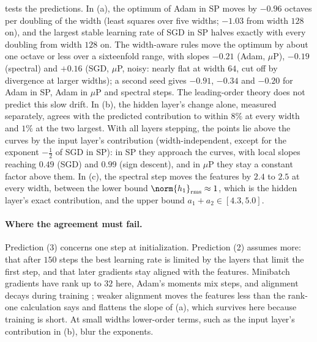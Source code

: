 \begin{refsection}
 tests the predictions. In (a), the optimum of Adam in SP moves by $-0.96$ octaves per doubling of the width (least squares over five widths; $-1.03$ from width $128$ on), and the largest stable learning rate of SGD in SP halves exactly with every doubling from width $128$ on. The width-aware rules move the optimum by about one octave or less over a sixteenfold range, with slopes $-0.21$ (Adam, $\mu$P), $-0.19$ (spectral) and $+0.16$ (SGD, $\mu$P, noisy: nearly flat at width $64$, cut off by divergence at larger widths); a second seed gives $-0.91$, $-0.34$ and $-0.20$ for Adam in SP, Adam in $\mu$P and spectral steps. The leading-order theory does not predict this slow drift. In (b), the hidden layer's change alone, measured separately, agrees with the predicted contribution to within $8\%$ at every width and $1\%$ at the two largest. With all layers stepping, the points lie above the curves by the input layer's contribution (width-independent, except for the exponent $-\frac12$ of SGD in SP): in SP they approach the curves, with local slopes reaching $0.49$ (SGD) and $0.99$ (sign descent), and in $\mu$P they stay a constant factor above them. In (c), the spectral step moves the features by $2.4$ to $2.5$ at every width, between the lower bound $\norm{h_1}_\rms\approx1$, which is the hidden layer's exact contribution, and the upper bound $a_1+a_2\in[4.3,5.0]$.

\paragraph{Where the agreement must fail.} Prediction (3) concerns one step at initialization. Prediction (2) assumes more: that after $150$ steps the best learning rate is limited by the layers that limit the first step, and that later gradients stay aligned with the features. Minibatch gradients have rank up to $32$ here, Adam's moments mix steps, and alignment decays during training \parencite{KossonEtAl2026}; weaker alignment moves the features less than the rank-one calculation says and flattens the slope of (a), which survives here because training is short. At small widths lower-order terms, such as the input layer's contribution in (b), blur the exponents.


\end{refsection}
